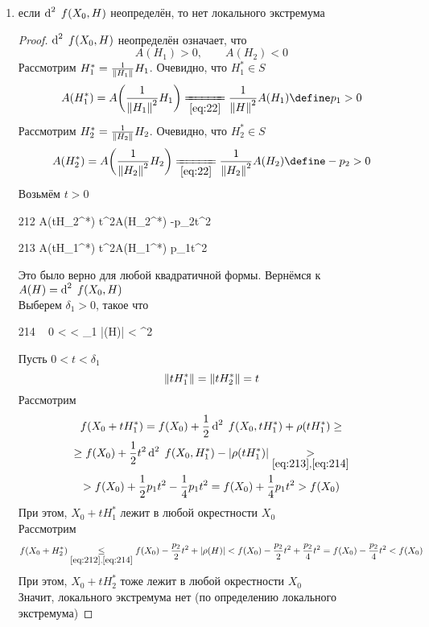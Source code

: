 \begin{theorem}
\begin{enumerate}
		\begin{proof}
			Аналогично
		\end{proof}
		\item\label{th:6} если $ \di[2] f(X_0, H) $ неопределён, то нет локального экстремума
		\begin{proof}
			$ \di[2] f(X_0, H) $ неопределён означает, что
			$$ A(H_1) > 0, \qquad A(H_2) < 0 $$
			Рассмотрим $ H_1^* = \frac1{\left\|{H_1}\right\|}H_1 $. Очевидно, что $ H_1^* \in S $
			$$ A(H_1^*) = A \bigg( \frac1{\norm{H_1}^2}H_1 \bigg) \undereq{\eref{22}} \frac1{\norm{H}^2}A(H_1) \define p_1 > 0 $$
			Рассмотрим $ H_2^* = \frac1{\left\|{H_2}\right\|}H_2 $. Очевидно, что $ H_2^* \in S $
			$$ A(H_2^*) = A \bigg( \frac1{\norm{H_2}^2}H_2 \bigg) \undereq{\eref{22}} \frac1{\norm{H_2}^2}A(H_2) \define -p_2 > 0 $$
			Возьмём $ t > 0 $
			\begin{equ}{212}
				A(tH_2^*)  t^2A(H_2^*)  -p_2t^2
			\end{equ}
			\begin{equ}{213}
				A(tH_1^*)  t^2A(H_1^*) \bdefeq{p_1} p_1t^2
			\end{equ}
			Это было верно для любой квадратичной формы. Вернёмся к $ A(H) = \di[2] f(X_0, H) $ \\
			Выберем $ \delta_1 > 0 $, такое что
			\begin{equ}{214}
				\forall ~ 0 <  < \delta_1 \quad |\rho(H)| <  \min{} \cdot \norm{H}^2
			\end{equ}
			Пусть $ 0 < t < \delta_1 $
			$$ \left\|{tH_1^*}\right\| = \left\|{tH_2^*}\right\| = t $$
			Рассмотрим
			\begin{multline*}
				f(X_0 + tH_1^*) = f(X_0) + \half \di[2] f(X_0, tH_1^*) + \rho(tH_1^*) \ge \\
				\ge f(X_0) + \half t^2 \di[2] f(X_0, H_1^*) - |\rho(tH_1^*)| \underset{\eref{213}, \eref{214}}> \\
				> f(X_0) + \half p_1t^2 - \frac14 p_1t^2 = f(X_0) + \frac14 p_1t^2 > f(X_0)
			\end{multline*}
			При этом, $ X_0 + tH_1^* $ лежит в любой окрестности $ X_0 $ \\
			Рассмотрим
			$$ f(X_0 + H_2^*) \underset{\eref{212}, \eref{214}}\le f(X_0) - \half[p_2]t^2 + |\rho(H)| < f(X_0) - \half[p_2]t^2 + \frac{p_2}4t^2 = f(X_0) - \frac{p_2}4t^2 < f(X_0) $$
			При этом, $ X_0 + tH_2^* $ тоже лежит в любой окрестности $ X_0 $ \\
			Значит, локального экстремума нет (по определению локального экстремума)
		\end{proof}
	\end{enumerate}
\end{theorem}
